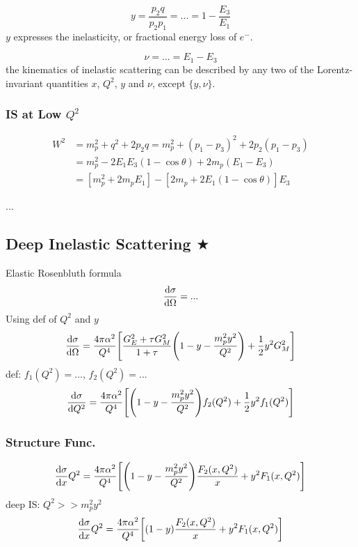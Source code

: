\documentclass[a4paper]{article}
\numberwithin{equation}{section}
\begin{document}
\begin{equation}\label{key}
y = \dfrac{p_2 q}{p_2 p_1} = ... = 1 - \dfrac{E_3}{E_1}
\end{equation}
$ y $ expresses the inelasticity, or fractional energy loss of $ e^- $.

\begin{equation}\label{key}
\nu = ... = E_1 - E_3
\end{equation}
the kinematics of inelastic scattering can be described by any two of the Lorentz-invariant quantities $ x $, $ Q^2 $, $ y $ and $ \nu $, except $ \{y, \nu\} $.\\

\subsubsection{IS at Low $ Q^2 $}
\begin{equation}\label{key}
\begin{aligned}
W^2 &= m_p^2 + q^2 + 2p_2 q = m_p^2 + (p_1 - p_3)^2 + 2p_2(p_1 - p_3)\\
&= m_p^2 -2E_1E_3(1 - \cos\theta) + 2m_p(E_1 - E_3)\\
&= [m_p^2 + 2m_pE_1] - [2m_p + 2E_1(1 - \cos\theta)] E_3
\end{aligned}
\end{equation}

...\\

\subsection{Deep Inelastic Scattering $ \bigstar $}
Elastic Rosenbluth formula
\begin{equation}\label{key}
\dv{\sigma}{\Omega} = ...
\end{equation}
Using def of $ Q^2 $ and $ y $
\begin{equation}\label{key}
\dv{\sigma}{\Omega} = \dfrac{4\pi\alpha^2}{Q^4} \qty[\dfrac{G_E^2 + \tau G_M^2}{1 + \tau} \qty(1 - y - \dfrac{m_p^2 y^2}{Q^2}) + \dfrac{1}{2}y^2 G_M^2]
\end{equation}
def: $ f_1(Q^2) = ... $, $ f_2(Q^2) = ... $
\begin{equation}\label{key}
\dv{\sigma}{Q^2} = \dfrac{4\pi\alpha^2}{Q^4} \qty[\qty(1 - y - \dfrac{m_p^2 y^2}{Q^2}) f_2(Q^2) + \dfrac{1}{2}y^2 f_1(Q^2)]
\end{equation}

\subsubsection{Structure Func.}
\begin{equation}\label{key}
\dv{\sigma}{x}{Q^2} = \dfrac{4\pi\alpha^2}{Q^4} \qty[\qty(1 - y - \dfrac{m_p^2 y^2}{Q^2}) \dfrac{F_2(x,Q^2)}{x} + y^2 F_1(x,Q^2)]
\end{equation}
deep IS: $ Q^2 >> m_p^2 y^2 $
\begin{equation}\label{key}
\dv{\sigma}{x}{Q^2} = \dfrac{4\pi\alpha^2}{Q^4} \qty[\qty(1 - y) \dfrac{F_2(x,Q^2)}{x} + y^2 F_1(x,Q^2)]
\end{equation}
\end{document}
